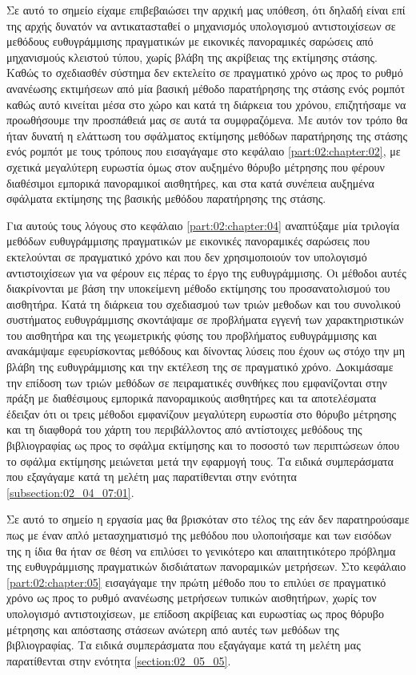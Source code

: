 Σε αυτό το σημείο είχαμε επιβεβαιώσει την αρχική μας υπόθεση, ότι δηλαδή είναι
επί της αρχής δυνατόν να αντικατασταθεί ο μηχανισμός υπολογισμού αντιστοιχίσεων
σε μεθόδους ευθυγράμμισης πραγματικών με εικονικές πανοραμικές σαρώσεις από
μηχανισμούς κλειστού τύπου, χωρίς βλάβη της ακρίβειας της εκτίμησης στάσης.
Καθώς το σχεδιασθέν σύστημα δεν εκτελείτο σε πραγματικό χρόνο ως προς το ρυθμό
ανανέωσης εκτιμήσεων από μία βασική μέθοδο παρατήρησης της στάσης ενός ρομπότ
καθώς αυτό κινείται μέσα στο χώρο και κατά τη διάρκεια του χρόνου, επιζητήσαμε
να προωθήσουμε την προσπάθειά μας σε αυτά τα συμφραζόμενα. Με αυτόν τον τρόπο
θα ήταν δυνατή η ελάττωση του σφάλματος εκτίμησης μεθόδων παρατήρησης της
στάσης ενός ρομπότ με τους τρόπους που εισαγάγαμε στο κεφάλαιο
\ref{part:02:chapter:02}, με σχετικά μεγαλύτερη ευρωστία όμως στον αυξημένο
θόρυβο μέτρησης που φέρουν διαθέσιμοι εμπορικά πανοραμικοί αισθητήρες, και στα
κατά συνέπεια αυξημένα σφάλματα εκτίμησης της βασικής μεθόδου παρατήρησης της
στάσης.

Για αυτούς τους λόγους στο κεφάλαιο \ref{part:02:chapter:04} αναπτύξαμε μία
τριλογία μεθόδων ευθυγράμμισης πραγματικών με εικονικές πανοραμικές σαρώσεις
που εκτελούνται σε πραγματικό χρόνο και που δεν χρησιμοποιούν τον υπολογισμό
αντιστοιχίσεων για να φέρουν εις πέρας το έργο της ευθυγράμμισης. Οι μέθοδοι
αυτές διακρίνονται με βάση την υποκείμενη μέθοδο εκτίμησης του προσανατολισμού
του αισθητήρα. Κατά τη διάρκεια του σχεδιασμού των τριών μεθοδων και του
συνολικού συστήματος ευθυγράμμισης σκοντάψαμε σε προβλήματα εγγενή των
χαρακτηριστικών του αισθητήρα και της γεωμετρικής φύσης του προβλήματος
ευθυγράμμισης και ανακάμψαμε εφευρίσκοντας μεθόδους και δίνοντας λύσεις που
έχουν ως στόχο την μη βλάβη της ευθυγράμμισης και την εκτέλεση της σε
πραγματικό χρόνο. Δοκιμάσαμε την επίδοση των τριών μεθόδων σε πειραματικές
συνθήκες που εμφανίζονται στην πράξη με διαθέσιμους εμπορικά πανοραμικούς
αισθητήρες και τα αποτελέσματα έδειξαν ότι οι τρεις μέθοδοι εμφανίζουν
μεγαλύτερη ευρωστία στο θόρυβο μέτρησης και τη διαφθορά του χάρτη του
περιβάλλοντος από αντίστοιχες μεθόδους της βιβλιογραφίας ως προς το σφάλμα
εκτίμησης και το ποσοστό των περιπτώσεων όπου το σφάλμα εκτίμησης μειώνεται
μετά την εφαρμογή τους. Τα ειδικά συμπεράσματα που εξαγάγαμε κατά τη μελέτη
μας παρατίθενται στην ενότητα \ref{subsection:02_04_07:01}.

Σε αυτό το σημείο η εργασία μας θα βρισκόταν στο τέλος της εάν δεν
παρατηρούσαμε πως με έναν απλό μετασχηματισμό της μεθόδου που υλοποιήσαμε και
των εισόδων της η ίδια θα ήταν σε θέση να επιλύσει το γενικότερο και
απαιτητικότερο πρόβλημα της ευθυγράμμισης πραγματικών δισδιάτατων πανοραμικών
μετρήσεων. Στο κεφάλαιο \ref{part:02:chapter:05} εισαγάγαμε την πρώτη μέθοδο
που το επιλύει σε πραγματικό χρόνο ως προς το ρυθμό ανανέωσης μετρήσεων τυπικών
αισθητήρων, χωρίς τον υπολογισμό αντιστοιχίσεων, με επίδοση ακρίβειας και
ευρωστίας ως προς θόρυβο μέτρησης και απόστασης στάσεων ανώτερη από αυτές των
μεθόδων της βιβλιογραφίας. Τα ειδικά συμπεράσματα που εξαγάγαμε κατά τη μελέτη
μας παρατίθενται στην ενότητα \ref{section:02_05_05}.
